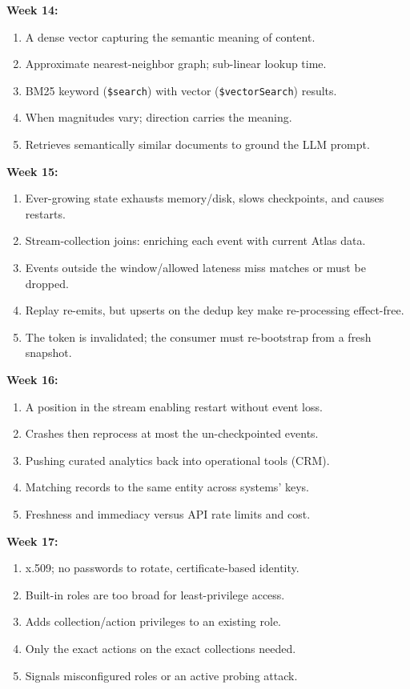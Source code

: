 \documentclass[11pt, a4paper]{article}
\begin{document}
\textbf{Week 14:}
\begin{enumerate}[itemsep=0pt]
    \item A dense vector capturing the semantic meaning of content.
    \item Approximate nearest-neighbor graph; sub-linear lookup time.
    \item BM25 keyword (\texttt{\$search}) with vector (\texttt{\$vectorSearch}) results.
    \item When magnitudes vary; direction carries the meaning.
    \item Retrieves semantically similar documents to ground the LLM prompt.
\end{enumerate}

\textbf{Week 15:}
\begin{enumerate}[itemsep=0pt]
    \item Ever-growing state exhausts memory/disk, slows checkpoints, and causes restarts.
    \item Stream-collection joins: enriching each event with current Atlas data.
    \item Events outside the window/allowed lateness miss matches or must be dropped.
    \item Replay re-emits, but upserts on the dedup key make re-processing effect-free.
    \item The token is invalidated; the consumer must re-bootstrap from a fresh snapshot.
\end{enumerate}

\textbf{Week 16:}
\begin{enumerate}[itemsep=0pt]
    \item A position in the stream enabling restart without event loss.
    \item Crashes then reprocess at most the un-checkpointed events.
    \item Pushing curated analytics back into operational tools (CRM).
    \item Matching records to the same entity across systems' keys.
    \item Freshness and immediacy versus API rate limits and cost.
\end{enumerate}

\textbf{Week 17:}
\begin{enumerate}[itemsep=0pt]
    \item x.509; no passwords to rotate, certificate-based identity.
    \item Built-in roles are too broad for least-privilege access.
    \item Adds collection/action privileges to an existing role.
    \item Only the exact actions on the exact collections needed.
    \item Signals misconfigured roles or an active probing attack.
\end{enumerate}
\end{document}
